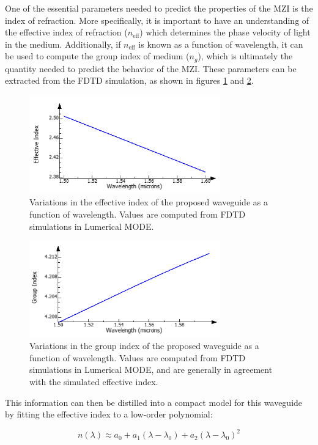 \documentclass[journal]{IEEEtran}
\begin{document}
One of the essential parameters needed to predict the properties of the MZI is the index of refraction. More specifically, it is important to have an understanding of the effective index of refraction ($n_{\text{eff}}$) which determines the phase velocity of light in the medium. Additionally, if $n_{\text{eff}}$ is known as a function of wavelength, it can be used to compute the group index of medium ($n_g$), which is ultimately the quantity needed to predict the behavior of the MZI. These parameters can be extracted from the FDTD simulation, as shown in figures \ref{fig:neff} and \ref{fig:ng}. 

\begin{figure}[t!]
  \centering
  \includegraphics[width = 3.25in]{fig/waveguide_dispersion_narrow.png}
  \caption{Variations in the effective index of the proposed waveguide as a function of wavelength. Values are computed from FDTD simulations in Lumerical MODE.}
  \label{fig:neff}
\end{figure}


\begin{figure}[t!]
  \centering
  \includegraphics[width = 3.25in]{fig/group_index_narrow.png}
  \caption{Variations in the group index of the proposed waveguide as a function of wavelength. Values are computed from FDTD simulations in Lumerical MODE, and are generally in agreement with the simulated effective index.}
  \label{fig:ng}
\end{figure}

This information can then be distilled into a compact model for this waveguide by fitting the effective index to a low-order polynomial:

\begin{equation}
n(\lambda)\approx a_0 + a_1(\lambda - \lambda_0) + a_2(\lambda - \lambda_0)^2
\label{eq:cm}
\end{equation}
\end{document}
